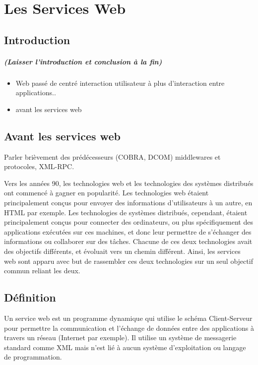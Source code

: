 \chapter{Les Services Web}
\newpage
\section{Introduction} 
\paragraph{(Laisser l'introduction et conclusion à la fin)}
\begin{itemize}
	\item Web passé de centré interaction utilisateur à plus d'interaction entre applications..
	\item avant les services web
\end{itemize}
		
\section{Avant les services web}
Parler brièvement des prédécesseurs (COBRA, DCOM) middlewares et protocoles, XML-RPC.\newline
		
Vers les années 90, les technologies web et les technologies des systèmes distribués ont commencé à gagner en popularité. Les technologies web étaient principalement conçus pour envoyer des informations d'utilisateurs à un autre, en HTML par exemple. Les technologies de systèmes distribués, cependant, étaient principalement conçus pour connecter des ordinateurs, ou plus spécifiquement des applications exécutées sur ces machines, et donc leur permettre de s'échanger des informations ou collaborer sur des tâches.
Chacune de ces deux technologies avait des objectifs différents, et évoluait vers un chemin différent. Ainsi, les services web sont apparu avec but de rassembler ces deux technologies sur un seul objectif commun reliant les deux.\cite{W3Road}

\section{Définition}
Un service web est un programme dynamique qui utilise le schéma Client-Serveur pour permettre la communication et l'échange de données entre des applications à travers un réseau (Internet par exemple).
Il utilise un système de messagerie standard comme XML mais n'est lié à aucun système d'exploitation ou langage de programmation.

